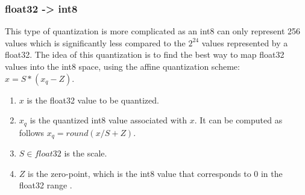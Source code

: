 \documentclass[licencjacka,en]{pracamgr}
\begin{document}
\subsubsection{float32 -> int8}
This type of quantization is more complicated as an int8 can only represent 256 values which is significantly less compared to the $ 2^24 $  values represented by a float32. The idea of this quantization is to find the best way to map float32 values into the int8 space, using the affine quantization scheme: $ x = S * (x_q - Z) $.
\begin{enumerate}
	\item $ x $ is the float32 value to be quantized.
	\item  $ x_q $ is the quantized int8 value associated with $ x $. It can be computed as follows $ x_q = round(x/S + Z) $.
	\item $ S \in float32$ is the scale.
	\item $ Z $ is the zero-point, which is the int8 value that corresponds to 0 in the float32 range \cite{quant_hf}.
\end{enumerate}
\end{document}
